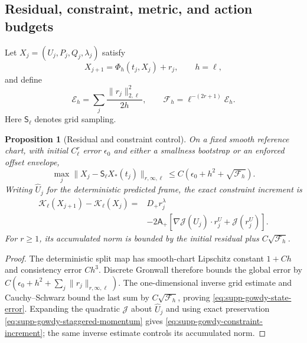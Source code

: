 \documentclass[11pt]{article}
\newtheorem{proposition}[proposition]{Proposition}
\theoremstyle{definition}
\theoremstyle{remark}
\begin{document}
\subsection{Residual, constraint, metric, and action budgets}

Let
$X_j=(U_j,P_j,Q_j,\lambda_j)$ satisfy
\begin{equation}
 X_{j+1}=\Phi_h(t_j,X_j)+r_j,
 \qquad h=\ell,
 \label{eq:supp-gowdy-residual-update}
\end{equation}
and define
\begin{equation}
 \mathcal E_h=\sum_j\frac{\|r_j\|_{2,\ell}^2}{2h},\qquad
 \mathcal F_h=\ell^{-(2r+1)}\mathcal E_h.
 \label{eq:supp-gowdy-residual-energy}
\end{equation}
Here $\mathsf S_\ell$ denotes grid sampling.

\begin{proposition}[Residual and constraint control]
\label{prop:supp-gowdy-residual-control}
On a fixed smooth reference chart, with initial $C^r_\ell$ error $\epsilon_0$
and either a smallness bootstrap or an enforced offset envelope,
\begin{equation}
 \boxed{
 \max_j\|X_j-\mathsf S_\ell X_*(t_j)\|_{r,\infty,\ell}
 \le C(\epsilon_0+h^2+\sqrt{\mathcal F_h}).}
 \label{eq:supp-gowdy-state-error}
\end{equation}
Writing $\widehat U_j$ for the deterministic predicted frame, the exact
constraint increment is
\begin{align}
 \mathcal K_\ell(X_{j+1})-\mathcal K_\ell(X_j)
 ={}&D_+r_j^\lambda\nonumber\\
 &-2\mathsf A_+
 [\nabla\mathcal J(\widehat U_j)\cdot r_j^U
   +\mathcal J(r_j^U)].
 \label{eq:supp-gowdy-constraint-increment}
\end{align}
For $r\ge1$, its accumulated norm is bounded by the initial residual plus
$C\sqrt{\mathcal F_h}$.
\end{proposition}

\begin{proof}
The deterministic split map has smooth-chart Lipschitz constant $1+Ch$ and
consistency error $Ch^3$.  Discrete Gronwall therefore bounds the global error
by
$C(\epsilon_0+h^2+\sum_j\|r_j\|_{r,\infty,\ell})$.
The one-dimensional inverse grid estimate and Cauchy--Schwarz bound the last
sum by $C\sqrt{\mathcal F_h}$, proving
\eqref{eq:supp-gowdy-state-error}.  Expanding the quadratic $\mathcal J$ about
$\widehat U_j$ and using exact preservation
\eqref{eq:supp-gowdy-staggered-momentum} gives
\eqref{eq:supp-gowdy-constraint-increment}; the same inverse estimate controls
its accumulated norm.
\end{proof}
\end{document}
